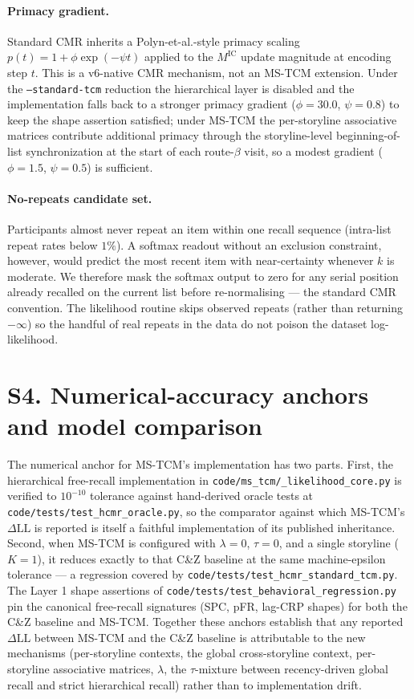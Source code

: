 \documentclass{article}
\newcommand{\tauinit}{\tau}
\begin{document}
\paragraph{Primacy gradient.}
Standard CMR inherits a Polyn-et-al.-style primacy scaling
$p(t) = 1 + \phi \exp(-\psi t)$ applied to the
$M^{\mathrm{IC}}$ update magnitude at encoding step $t$. This is a
v6-native CMR mechanism, not an MS-TCM extension. Under the
\texttt{--standard-tcm} reduction the hierarchical layer is disabled
and the implementation falls back to a stronger primacy gradient
($\phi = 30.0$, $\psi = 0.8$) to keep the shape assertion satisfied;
under MS-TCM the per-storyline associative matrices contribute
additional primacy through the storyline-level beginning-of-list
synchronization at the start of each route-$\beta$ visit, so a
modest gradient ($\phi = 1.5$, $\psi = 0.5$) is sufficient.

\paragraph{No-repeats candidate set.}
Participants almost never repeat an item within one recall sequence
(intra-list repeat rates below $1\%$). A softmax readout without an
exclusion constraint, however, would predict the most recent item
with near-certainty whenever $k$ is moderate. We therefore mask the
softmax output to zero for any serial position already recalled on
the current list before re-normalising --- the standard CMR
convention. The likelihood routine skips observed repeats (rather
than returning $-\infty$) so the handful of real repeats in the
data do not poison the dataset log-likelihood.

\section*{S4. Numerical-accuracy anchors and model comparison}

The numerical anchor for MS-TCM's implementation has two parts.
First, the \citet{CornellZhang2025} hierarchical free-recall
implementation in \texttt{code/ms\_tcm/\_likelihood\_core.py} is
verified to $10^{-10}$ tolerance against hand-derived oracle tests at
\texttt{code/tests/test\_hcmr\_oracle.py}, so the comparator against
which MS-TCM's $\Delta\mathrm{LL}$ is reported is itself a faithful
implementation of its published inheritance. Second, when MS-TCM is
configured with $\lambda = 0$, $\tauinit = 0$, and a single storyline
($K = 1$), it reduces exactly to that C\&Z baseline at the same
machine-epsilon tolerance --- a regression covered by
\texttt{code/tests/test\_hcmr\_standard\_tcm.py}. The Layer 1 shape
assertions of \texttt{code/tests/test\_behavioral\_regression.py} pin
the canonical free-recall signatures (SPC, pFR, lag-CRP shapes) for
both the C\&Z baseline and MS-TCM. Together these anchors establish
that any reported $\Delta\mathrm{LL}$ between MS-TCM and the C\&Z
baseline is attributable to the new mechanisms (per-storyline
contexts, the global cross-storyline context, per-storyline
associative matrices, $\lambda$, the $\tauinit$-mixture between
recency-driven global recall and strict hierarchical recall) rather
than to implementation drift.

\newpage
\renewcommand{\refname}{Supplementary references}


\end{document}
